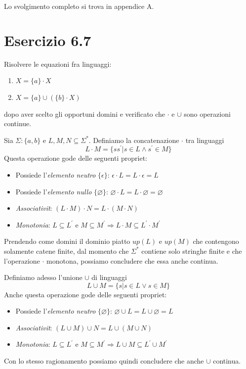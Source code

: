 		Lo svolgimento completo si trova in appendice A.
		
		\newpage
	
	\section{Esercizio 6.7}
		Risolvere le equazioni fra linguaggi:
		\begin{enumerate}
		  \item $X = \{a\} \cdot X$
		  \item $X = \{a\} \cup (\{b\} \cdot X)$
		\end{enumerate}
		dopo aver scelto gli opportuni domini e verificato che $\cdot$ e $\cup$ sono
		operazioni continue.
		\sectionline
	
		Sia $\Sigma:\{a,b\}$ e $L,M,N \subseteq \Sigma^{*}$. Definiamo la concatenazione $\cdot$ tra linguaggi $$L\cdot M = \{ss^{'}|s\in L \land s^{'}\in M\}$$
		Questa operazione gode delle seguenti propriet\aacc:
		\begin{itemize}
			\item Possiede l'\emph{elemento neutro} $\{\epsilon\}$: $\epsilon \cdot L = L\cdot \epsilon = L$
			\item Possiede l'\emph{elemento nullo} $\{\varnothing\}$: $\varnothing \cdot L = L\cdot \varnothing = \varnothing$
			\item \emph{Associativit\aacc}: $(L\cdot M)\cdot N = L\cdot (M\cdot N)$
			\item \emph{Monotonia}: $L\subseteq L^{'}$ e $M\subseteq M^{'} \Rightarrow L\cdot M \subseteq L^{'}\cdot M^{'}$ 
		\end{itemize}
		Prendendo come domini il dominio piatto $up(L)$ e $up(M)$ che contengono solamente catene finite, dal momento che $\Sigma^{*}$ contiene solo stringhe finite e che l'operazione $\cdot$ \eacc monotona, possiamo concludere che essa \eacc anche continua.
		
		Definiamo adesso l'unione $\cup$ di linguaggi $$L\cup M = \{s|s\in L \lor s\in M\}$$
		Anche questa operazione gode delle seguenti propriet\aacc:
		\begin{itemize}
			\item Possiede l'\emph{elemento neutro} $\{\varnothing \}$: $\varnothing \cup L = L\cup \varnothing = L$
			\item \emph{Associativit\aacc}: $(L\cup M)\cup N = L\cup (M\cup N)$
			\item \emph{Monotonia}: $L\subseteq L^{'}$ e $M\subseteq M^{'} \Rightarrow L\cup M \subseteq L^{'}\cup M^{'}$ 
		\end{itemize}
		Con lo stesso ragionamento possiamo quindi concludere che anche $\cup$ \eacc  continua.
		
